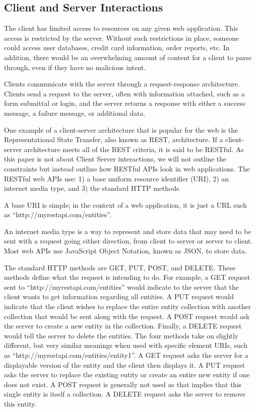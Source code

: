 \documentclass[12pt]{ucthesis}
\begin{document}
\subsection{Client and Server Interactions}
The client has limited access to resources on any given web application. This access is restricted by the server. Without such restrictions in place, someone could access user databases, credit card information, order reports, etc. In addition, there would be an overwhelming amount of content for a client to parse through, even if they have no malicious intent.

Clients communicate with the server through a request-response architecture. Clients send a request to the server, often with information attached, such as a form submittal or login, and the server returns a response with either a success message, a failure message, or additional data.

One example of a client-server architecture that is popular for the web is the Representational State Transfer, also known as REST, architecture. If a client-server architecture meets all of the REST criteria, it is said to be RESTful. As this paper is not about Client Server interactions, we will not outline the constraints but instead outline how RESTful APIs look in web applications. The RESTful web APIs use: 1) a base uniform resource identifier (URI), 2) an internet media type, and 3) the standard HTTP methods.

A base URI is simple; in the context of a web application, it is just a URL such as ``http://myrestapi.com/entities''.

An internet media type is a way to represent and store data that may need to be sent with a request going either direction, from client to server or server to client. Most web APIs use JavaScript Object Notation, known as JSON, to store data.

The standard HTTP methods are GET, PUT, POST, and DELETE. These methods define what the request is intending to do. For example, a GET request sent to ``http://myrestapi.com/entities'' would indicate to the server that the client wants to get information regarding all entities. A PUT request would indicate that the client wishes to replace the entire entity collection with another collection that would be sent along with the request. A POST request would ask the server to create a new entity in the collection. Finally, a DELETE request would tell the server to delete the entities. The four methods take on slightly different, but very similar meanings when used with specific element URIs, such as ``http://myrestapi.com/entities/entity1''. A GET request asks the server for a displayable version of the entity and the client then displays it. A PUT request asks the server to replace the existing entity or create an entire new entity if one does not exist. A POST request is generally not used as that implies that this single entity is itself a collection. A DELETE request asks the server to remove this entity.
\end{document}
